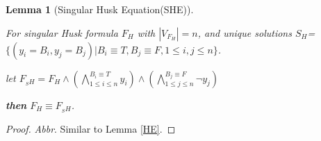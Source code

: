 \documentclass[conference]{IEEEtran}
\newtheorem{lemma}{\textbf{Lemma}}
\begin{document}
\begin{lemma}[Singular Husk Equation(SHE)]\label{SHE}

For singular Husk formula ${F_H}$ with $|V_{F_H}|= n$,
and unique solutions $S_H$=$\{(y_i=B_i,y_j=B_j)|B_i\equiv T, B_j\equiv F, 1\leqslant i, j\leqslant n \}$.

let $F_{_SH}=F_H\wedge (\bigwedge_{1\leqslant i\leqslant n}^{B_i\equiv T}y_i)\wedge(\bigwedge_{1\leqslant j\leqslant n}^{B_j\equiv F}\neg y_j)$

\textbf{then} $F_H \equiv F_{_SH}$.
\end{lemma}
\begin{proof}
\textsl{Abbr}. Similar to Lemma \ref{HE}.
\end{proof}

% 
% 
% 
% 
% 
\end{document}

